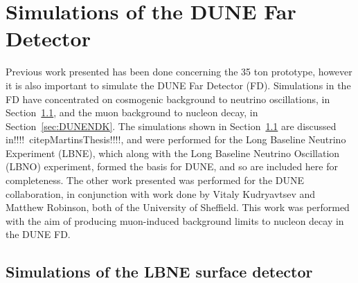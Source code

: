 

\chapter{Simulations of the DUNE Far Detector}  %
\graphicspath{{FarDetectorSimulations/Figs/Raster/}{FarDetectorSimulations/Figs/PDF/}{FarDetectorSimulations/Figs/}}

Previous work presented has been done concerning the 35 ton prototype, however it is also important to simulate the DUNE Far Detector (FD). Simulations in the FD have concentrated on cosmogenic background to neutrino oscillations, in Section~\ref{sec:LBNESurf}, and the muon background to nucleon decay, in Section~\ref{sec:DUNENDK}. The simulations shown in Section~\ref{sec:LBNESurf} are discussed in!!!!~citep{MartinsThesis}!!!!, and were performed for the Long Baseline Neutrino Experiment (LBNE), which along with the Long Baseline Neutrino Oscillation (LBNO) experiment, formed the basis for DUNE, and so are included here for completeness. The other work presented was performed for the DUNE collaboration, in conjunction with work done by Vitaly Kudryavtsev and Matthew Robinson, both of the University of Sheffield. This work was performed with the aim of producing muon-induced background limits to nucleon decay in the DUNE FD. \\

\section{Simulations of the LBNE surface detector} \label{sec:LBNESurf} %

